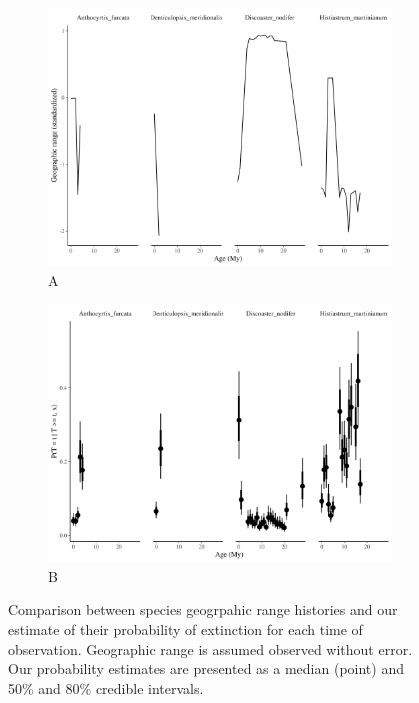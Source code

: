 \documentclass[12pt,letterpaper]{article}
\begin{document}
\begin{figure}[ht]
  \centering
  \begin{subfigure}{\textwidth}
    \includegraphics[width=\textwidth,height=0.5\textheight,keepaspectratio=true]{figure/relrisk_range}
    \caption{A}
    \label{fig:relrisk_range}
  \end{subfigure}

  \begin{subfigure}{\textwidth}
    \includegraphics[width=\textwidth,height=0.5\textheight,keepaspectratio=true]{figure/relrisk_ext}
    \caption{B}
    \label{fig:relrisk_ext}
  \end{subfigure}
  \caption{Comparison between species geogrpahic range histories and our estimate of their probability of extinction for each time of observation. Geographic range is assumed observed without error. Our probability estimates are presented as a median (point) and 50\% and 80\% credible intervals.}
  \label{fig:relrisk_compare}
\end{figure}
\end{document}
